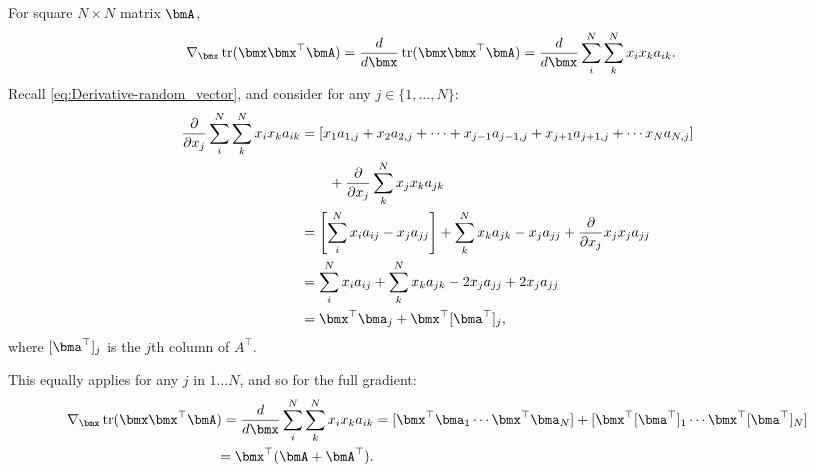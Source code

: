\documentclass[11pt]{article}
\DeclareMathOperator{\Trace}{tr}
\begin{document}
For square $N\times N$ matrix $\bmA$,
\begin{align*}
\nabla_{\bmx}\Trace(\bmx \bmx^\top \bmA) =
\frac{d}{d \bmx}\Trace(\bmx \bmx^\top \bmA) &=
\frac{d}{d \bmx} \sum_{i}^{N} \sum_{k}^{N} x_i x_k a_{ik}.
\end{align*}
Recall \cref{eq:Derivative-random_vector}, and consider for any $j \in \{1,\ldots, N\}$:
\begin{align*}
\frac{\partial}{\partial x_j} \sum_{i}^{N} \sum_{k}^{N} x_i x_k a_{ik} &=
[x_1a_{1,j} + x_2a_{2,j} + \cdots + x_{j-1}a_{j-1,j} + x_{j+1}a_{j+1,j} + \cdots x_N a_{N,j}] \\ &\qquad + \frac{\partial}{\partial x_j} \sum_{k}^{N} x_j x_k a_{jk} \\
&= \left[\sum_i^N x_ia_{ij} - x_ja_{jj}\right] + \sum_{k}^{N} x_k a_{jk} - x_ja_{jj} + \frac{\partial}{\partial x_j} x_j x_j a_{jj} \\
&= \sum_i^N x_ia_{ij} + \sum_{k}^{N} x_k a_{jk} - 2 x_ja_{jj} + 2 x_ja_{jj} \\
&= \bmx^\top \bma_j + \bmx^\top [\bma^\top]_j,
\end{align*}
where $[\bma^\top]_j$ is the $j$th column of $A^\top$.

This equally applies for any $j$ in $1\ldots N$, and so for the full gradient:
\begin{align*}
\nabla_{\bmx}\Trace(\bmx \bmx^\top \bmA) =
\frac{d}{d \bmx} \sum_{i}^{N} \sum_{k}^{N} x_i x_k a_{ik} &=
[\bmx^\top \bma_1 \cdots \bmx^\top \bma_N] + [\bmx^\top [\bma^\top]_1 \cdots \bmx^\top [\bma^\top]_N] \\
= \bmx^\top (\bmA + \bmA^\top).
\end{align*}
\end{document}
